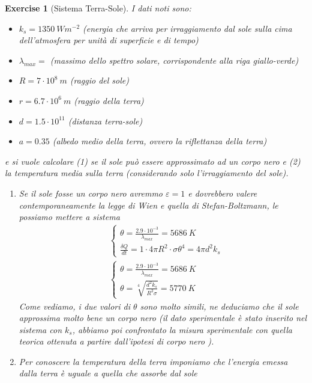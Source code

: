 \documentclass[10pt,a4paper]{article}
\newtheorem{exercise}{Exercise}
\begin{document}
\begin{exercise}[Sistema Terra-Sole]
I dati noti sono:
\begin{itemize}
	\item $k_s = 1350\ W m^{-2}$  (energia che arriva per irraggiamento dal sole sulla cima dell'atmosfera per unità di superficie e di tempo)
	\item $\lambda_{max} = $      (massimo dello spettro solare, corrispondente alla riga giallo-verde)
	\item $R = 7\cdot 10^8\ m$ (raggio del sole)
	\item $r = 6.7\cdot 10^6\ m$ (raggio della terra)
	\item $d = 1.5 \cdot 10^{11}$ (distanza terra-sole)
	\item $a = 0.35 $ (albedo medio della terra, ovvero la riflettanza della terra)
\end{itemize}
e si vuole calcolare (1) se il sole può essere approssimato ad un corpo nero e (2) la temperatura media sulla terra (considerando solo l'irraggiamento del sole).\\
\begin{enumerate}
	\item  Se il sole fosse un corpo nero avremmo $\varepsilon = 1$ e dovrebbero valere contemporaneamente la legge di Wien e quella di Stefan-Boltzmann, le possiamo mettere a sistema
	\begin{align*}
		&\begin{cases}
			\theta = \frac{2.9 \cdot 10^{-3}}{\lambda_{max}} = 5686\ K\\
			\frac{\delta Q}{dt} = 1 \cdot 4\pi R^2\cdot \sigma \theta^4 = 4\pi d^2 k_s
		\end{cases}\\
	&\begin{cases}
		\theta = \frac{2.9 \cdot 10^{-3}}{\lambda_{max}} = 5686\ K\\
		\theta = \sqrt[4]{\frac{d^2 k_s}{R^2 \sigma}} = 5770\ K
	\end{cases}
	\end{align*}
	Come vediamo, i due valori di $\theta$ sono molto simili, ne deduciamo che il sole approssima molto bene un corpo nero (il dato sperimentale è stato inserito nel sistema con \(k_s\), abbiamo poi confrontato la misura sperimentale con quella teorica ottenuta a partire dall'ipotesi di corpo nero ). 
	\item Per conoscere la temperatura della terra imponiamo che l'energia emessa dalla terra è uguale a quella che assorbe dal sole
	\begin{align*}

\end{align*}
\end{enumerate}
\end{exercise}
\end{document}
